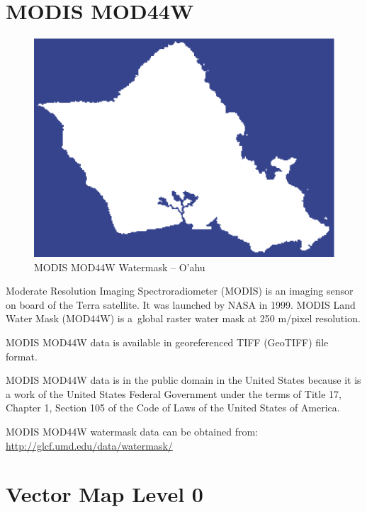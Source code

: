 \section{MODIS MOD44W}

\begin{figure}[h!]
  \centering
  \includegraphics[width=120mm]{images/mod44w_oahu.eps}
  \caption{MODIS MOD44W Watermask -- O'ahu}
\end{figure}

Moderate Resolution Imaging Spectroradiometer (MODIS) is an imaging sensor on board of the Terra satellite. It was launched by NASA in 1999. MODIS Land Water Mask (MOD44W) is a global raster water mask at 250 m/pixel resolution.

MODIS MOD44W data is available in georeferenced TIFF (GeoTIFF) file format.

MODIS MOD44W data is in the public domain in the United States because it is a work of the United States Federal Government under the terms of Title 17, Chapter 1, Section 105 of the Code of Laws of the United States of America.

MODIS MOD44W watermask data can be obtained from: \cite{Terrain-WaterMaskGLCF} \\
\url{http://glcf.umd.edu/data/watermask/}

\section{Vector Map Level 0}

